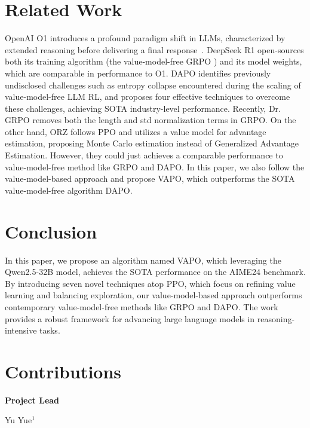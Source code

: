 \section{Related Work}

OpenAI O1 \citep{o1} introduces a profound paradigm shift in LLMs, characterized by extended reasoning before delivering a final response~\cite{grok,qwq,gemini-thinking}. 
DeepSeek R1 \citep{deepseekai2025deepseekr1incentivizingreasoningcapability} open-sources both its training algorithm (the value-model-free GRPO \cite{shao2024deepseekmath}) and its model weights, which are comparable in performance to O1. DAPO \cite{dapo} identifies previously undisclosed challenges such as entropy collapse encountered during the scaling of value-model-free LLM RL, and proposes four effective techniques to overcome these challenges, achieving SOTA industry-level performance. Recently, Dr. GRPO \cite{liu2025understandingr1zeroliketrainingcritical} removes both the length and std normalization terms in GRPO.
On the other hand, ORZ \cite{hu2025openreasonerzeroopensourceapproach} follows PPO and utilizes a value model for advantage estimation, proposing Monte Carlo estimation instead of Generalized Advantage Estimation. However, they could just achieves a comparable performance to value-model-free method like GRPO and DAPO. In this paper, we also follow the value-model-based approach and propose VAPO, which outperforms the SOTA value-model-free algorithm DAPO.

\section{Conclusion}
In this paper, we propose an algorithm named VAPO, which leveraging the Qwen2.5-32B model, achieves the SOTA performance on the AIME24 benchmark. By introducing seven novel techniques atop PPO, which focus on refining value learning and balancing exploration, our value-model-based approach outperforms contemporary value-model-free methods like GRPO and DAPO. The work provides a robust framework for advancing large language models in reasoning-intensive tasks.


\newpage

\section*{Contributions}

\textbf{Project Lead}\quad 

Yu Yue$^{1}$

